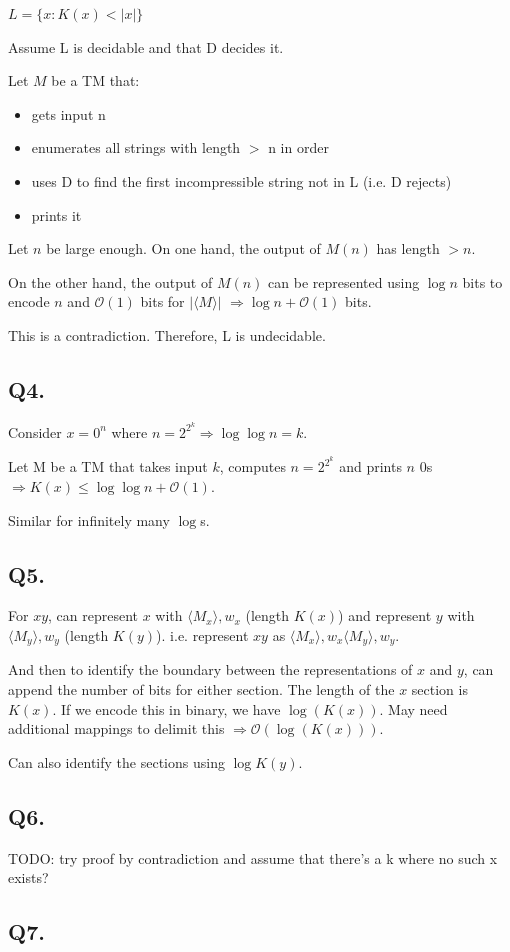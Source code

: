 \documentclass[letterpaper]{article}
\begin{document}
$L = \{ x : K(x) < |x|\}$

Assume L is decidable and that D decides it.

Let $M$ be a TM that:
\begin{itemize}
  \item gets input n
  \item enumerates all strings with length $>$ n in order
  \item uses D to find the first incompressible string not in L (i.e. D rejects)
  \item prints it
\end{itemize}

Let $n$ be large enough.
On one hand, the output of $M(n)$ has length $>n$.

On the other hand, the output of $M(n)$ can be represented using
$\log n$ bits to encode $n$ and $\mathcal{O}(1)$ bits for $|\langle M \rangle|$
$\Rightarrow \log n + \mathcal{O}(1)$ bits.

This is a contradiction. Therefore, L is undecidable.

\subsection*{Q4.}

Consider $x = 0^n$ where $n = 2^{2^k} \Rightarrow \log \log n = k$.

Let M be a TM that takes input $k$, computes $n = 2^{2^k}$ and prints $n$ 0s
$\Rightarrow K(x) \le \log\log n + \mathcal{O}(1)$.

Similar for infinitely many $\log$s.

\subsection*{Q5.}

For $xy$, can represent $x$ with $\langle M_x \rangle,w_x$ (length $K(x)$) and represent
$y$ with $\langle M_y \rangle,w_y$ (length $K(y)$).
i.e. represent $xy$ as $\langle M_x \rangle,w_x\langle M_y \rangle,w_y$.

And then to identify the boundary between the representations of
$x$ and $y$, can append the number of bits for either section.
The length of the $x$ section is $K(x)$. If we encode this in binary, we have
$\log(K(x))$. May need additional mappings to delimit this
$\Rightarrow \mathcal{O}(\log(K(x)))$.

Can also identify the sections using $\log K(y)$.

\subsection*{Q6.}

TODO: try proof by contradiction and assume that there's a k where no
such x exists?

\subsection*{Q7.}
\end{document}
